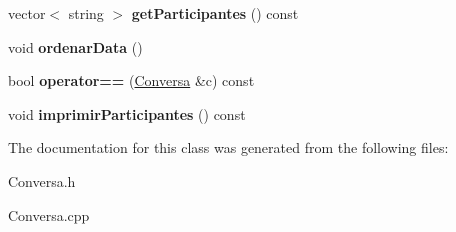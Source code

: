 \begin{DoxyCompactItemize}
\item 
\hypertarget{class_conversa_afe17736f50a6ab6b471be57c64da79dc}{}vector$<$ string $>$ {\bfseries get\+Participantes} () const \label{class_conversa_afe17736f50a6ab6b471be57c64da79dc}

\item 
\hypertarget{class_conversa_a8f575a8d5137b94f5190e85998b01b8d}{}void {\bfseries ordenar\+Data} ()\label{class_conversa_a8f575a8d5137b94f5190e85998b01b8d}

\item 
\hypertarget{class_conversa_a3a7785ca7dfa6154bd33566d5fe2ed04}{}bool {\bfseries operator==} (\hyperlink{class_conversa}{Conversa} \&c) const \label{class_conversa_a3a7785ca7dfa6154bd33566d5fe2ed04}

\item 
\hypertarget{class_conversa_a6c783d4e16c1e7c76406eedbccd13da8}{}void {\bfseries imprimir\+Participantes} () const \label{class_conversa_a6c783d4e16c1e7c76406eedbccd13da8}

\end{DoxyCompactItemize}


The documentation for this class was generated from the following files\+:\begin{DoxyCompactItemize}
\item 
Conversa.\+h\item 
Conversa.\+cpp\end{DoxyCompactItemize}
